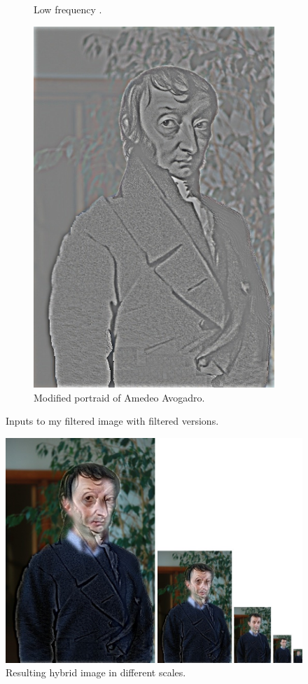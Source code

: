 \documentclass{article}
\begin{document}
\begin{figure}[!htb]
\begin{subfigure}{.4\textwidth}
  \caption{Low frequency .}
\end{subfigure}
\begin{subfigure}{.4\textwidth}
  \centering
  \includegraphics[width=.8\textwidth]{high_frequencies_avog.jpg}
  \caption{Modified portraid of Amedeo Avogadro.}
\end{subfigure}
\caption{Inputs to my filtered image with filtered versions.}
\end{figure}

\newpage

\begin{figure}[!htb]
\centering
\includegraphics[width=1\textwidth]{hybrid_image_scales.jpg}
\caption{Resulting hybrid image in different scales.}
\end{figure}
\end{document}
